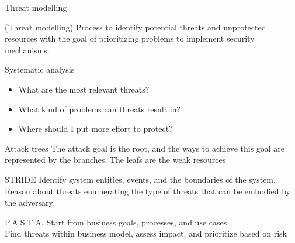 \begin{parag}{Threat modelling}
	\begin{definition}{(Threat modelling)}
   Process to identify potential threats and unprotected resources with the goal of prioritizing problems to implement security mechanisms. 
    \end{definition}
	\begin{subparag}{Systematic analysis}
	    \begin{itemize}
	        \item What are the most relevant threats?
	        \item What kind of problems can threats result in?
	        \item Where should I put more effort to protect?
	    \end{itemize}
	\end{subparag}
	\begin{subparag}{Attack trees}
	    The attack goal is the root, and the ways to achieve this goal are represented by the branches. The leafs are the weak resources
	\end{subparag}
	\begin{subparag}{STRIDE}
	    Identify system entities, events, and the boundaries of the system. Reason about threats enumerating the type of threats that can be embodied by the adversary
	\end{subparag}
	\begin{subparag}{P.A.S.T.A.}
	    Start from business goals, processes, and use cases.\\
		Find threats within business model, assess impact, and prioritize based on risk
	\end{subparag}
\end{parag}

